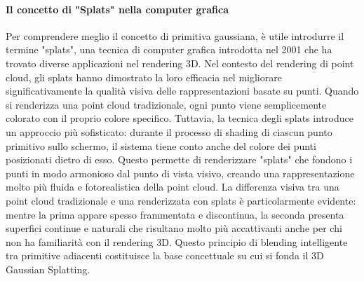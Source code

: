 \paragraph{Il concetto di "Splats" nella computer grafica
}
Per comprendere meglio il concetto di primitiva gaussiana, è utile introdurre il termine "splats", una tecnica di computer grafica introdotta nel 2001 che ha trovato diverse applicazioni nel rendering 3D. Nel contesto del rendering di point cloud, gli splats hanno dimostrato la loro efficacia nel migliorare significativamente la qualità visiva delle rappresentazioni basate su punti.
Quando si renderizza una point cloud tradizionale, ogni punto viene semplicemente colorato con il proprio colore specifico. Tuttavia, la tecnica degli splats introduce un approccio più sofisticato: durante il processo di shading di ciascun punto primitivo sullo schermo, il sistema tiene conto anche del colore dei punti posizionati dietro di esso. Questo permette di renderizzare "splats" che fondono i punti in modo armonioso dal punto di vista visivo, creando una rappresentazione molto più fluida e fotorealistica della point cloud.
La differenza visiva tra una point cloud tradizionale e una renderizzata con splats è particolarmente evidente: mentre la prima appare spesso frammentata e discontinua, la seconda presenta superfici continue e naturali che risultano molto più accattivanti anche per chi non ha familiarità con il rendering 3D. Questo principio di blending intelligente tra primitive adiacenti costituisce la base concettuale su cui si fonda il 3D Gaussian Splatting.


